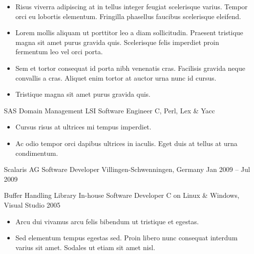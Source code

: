 \documentclass[10pt, a4paper]{cvhari}
\begin{document}
            \begin{itemize}
                \item Risus viverra adipiscing at in tellus integer feugiat scelerisque varius. Tempor orci eu lobortis elementum. Fringilla phasellus faucibus scelerisque eleifend.\smallskip
                \item Lorem mollis aliquam ut porttitor leo a diam sollicitudin. Praesent tristique magna sit amet purus gravida quis. Scelerisque felis imperdiet proin fermentum leo vel orci porta.\smallskip
                \item Sem et tortor consequat id porta nibh venenatis cras. Facilisis gravida neque convallis a cras. Aliquet enim tortor at auctor urna nunc id cursus.\smallskip
                \item Tristique magna sit amet purus gravida quis.\smallskip
            \end{itemize}

        \dividergray
        
        \project
            {SAS Domain Management}
            {LSI}
            {Software Engineer}
            {C, Perl, Lex \& Yacc}
        
            \begin{itemize}
                \item Cursus risus at ultrices mi tempus imperdiet. \smallskip
                \item Ac odio tempor orci dapibus ultrices in iaculis. Eget duis at tellus at urna condimentum.\smallskip
            \end{itemize}

\smallskip
\divider
\smallskip

    \company
        {Scalaris AG}
        {Software Developer}
        {Villingen-Schwenningen, Germany}
        {Jan 2009 – Jul 2009}
        
        \project
            {Buffer Handling Library}
            {In-house}
            {Software Developer}
            {C on Linux \& Windows, Visual Studio 2005}
    
            \begin{itemize}
                \item Arcu dui vivamus arcu felis bibendum ut tristique et egestas.\smallskip
                
                \item Sed elementum tempus egestas sed. Proin libero nunc consequat interdum varius sit amet. Sodales ut etiam sit amet nisl.
            \end{itemize}
\end{document}

